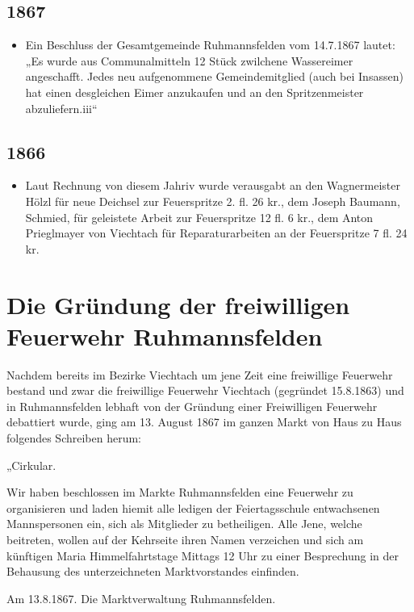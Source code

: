 \documentclass[12pt,a4paper]{book}
\begin{document}
\section*{1867}

\begin{itemize}
\item Ein Beschluss der Gesamtgemeinde Ruhmannsfelden vom 14.7.1867 lautet: „Es
wurde aus Communalmitteln 12 Stück zwilchene Wassereimer angeschafft. Jedes neu
aufgenommene Gemeindemitglied (auch bei Insassen) hat einen desgleichen Eimer
anzukaufen und an den Spritzenmeister abzuliefern.iii“
\end{itemize}

\section*{1866}

\begin{itemize}
\item Laut Rechnung von diesem Jahriv wurde verausgabt an den Wagnermeister
Hölzl für neue Deichsel zur Feuerspritze 2. fl. 26 kr., dem Joseph Baumann,
Schmied, für geleistete Arbeit zur Feuerspritze 12 fl. 6 kr., dem Anton
Prieglmayer von Viechtach für Reparaturarbeiten an der Feuerspritze 7 fl. 24 kr.
\end{itemize}

\chapter{Die Gründung der freiwilligen Feuerwehr Ruhmannsfelden}

Nachdem bereits im Bezirke Viechtach um jene Zeit eine freiwillige Feuerwehr
bestand und zwar die freiwillige Feuerwehr Viechtach (gegründet 15.8.1863) und
in Ruhmannsfelden lebhaft von der Gründung einer Freiwilligen Feuerwehr
debattiert wurde, ging am 13. August 1867 im ganzen Markt von Haus zu Haus
folgendes Schreiben herum:

„Cirkular.

Wir haben beschlossen im Markte Ruhmannsfelden eine Feuerwehr zu organisieren
und laden hiemit alle ledigen der Feiertagsschule entwachsenen Mannspersonen
ein, sich als Mitglieder zu betheiligen. Alle Jene, welche beitreten, wollen auf
der Kehrseite ihren Namen verzeichen und sich am künftigen Maria
Himmelfahrtstage Mittags 12 Uhr zu einer Besprechung in der Behausung des
unterzeichneten Marktvorstandes einfinden.

Am 13.8.1867. Die Marktverwaltung Ruhmannsfelden.
\end{document}
